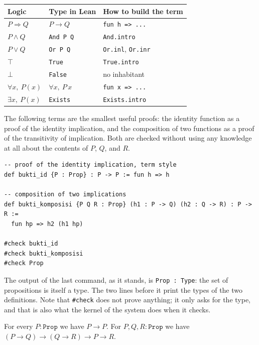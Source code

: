 \begin{center}
\begin{tabular}{lll}
\hline
Logic & Type in Lean & How to build the term \\
\hline
$P\Rightarrow Q$   & $P\to Q$              & \texttt{fun h => ...} \\
$P\wedge Q$        & \texttt{And P Q}      & \texttt{And.intro} \\
$P\vee Q$          & \texttt{Or P Q}       & \texttt{Or.inl}, \texttt{Or.inr} \\
$\top$             & \texttt{True}         & \texttt{True.intro} \\
$\bot$             & \texttt{False}        & no inhabitant \\
$\forall x,\ P(x)$ & $\forall x,\ P\,x$    & \texttt{fun x => ...} \\
$\exists x,\ P(x)$ & \texttt{Exists}       & \texttt{Exists.intro} \\
\hline
\end{tabular}
\end{center}


The following terms are the smallest useful proofs: the identity function as a proof of the identity
implication, and the composition of two functions as a proof of the transitivity of implication.
Both are checked without using any knowledge at all about the contents of $P$, $Q$, and $R$.

\begin{verbatim}
-- proof of the identity implication, term style
def bukti_id {P : Prop} : P -> P := fun h => h

-- composition of two implications
def bukti_komposisi {P Q R : Prop} (h1 : P -> Q) (h2 : Q -> R) : P -> R :=
  fun hp => h2 (h1 hp)

#check bukti_id
#check bukti_komposisi
#check Prop
\end{verbatim}

The output of the last command, as it stands, is \texttt{Prop : Type}: the set of propositions is
itself a type. The two lines before it print the types of the two definitions. Note that
\texttt{\#check} does not prove anything; it only asks for the type, and that is also what the
kernel of the system does when it checks.

\begin{proposisi}
For every $P:\mathtt{Prop}$ we have $P\to P$. For $P,Q,R:\mathtt{Prop}$ we have
$(P\to Q)\to(Q\to R)\to P\to R$.
\end{proposisi}

